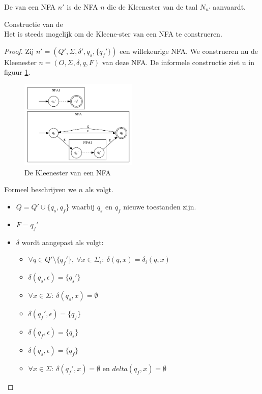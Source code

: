 \documentclass[main.tex]{subfiles}
\begin{document}
\begin{de}
  De  van een NFA $n'$ is de NFA $n$ die de Kleenester van de taal $N_{n'}$ aanvaardt.
\end{de}

\begin{st}
  Constructie van de \\
  Het is steeds mogelijk om de Kleene-ster van een NFA te construeren.

  \begin{proof}
    Zij $n' = (Q',\Sigma,\delta',q_{s},\{q_{f}'\})$ een willekeurige NFA. We construeren nu de Kleenester $n = (O,\Sigma,\delta,q,F)$ van deze NFA.
    De informele constructie ziet u in figuur \ref{fig:nfa_kleene}.
    \begin{figure}[H]
      \centering
      \includegraphics[width=0.5\textwidth]{assets/nfa_kleene.png}      
      \caption{De Kleenester van een NFA}
      \label{fig:nfa_kleene}
    \end{figure}
    Formeel beschrijven we $n$ als volgt.
    \begin{itemize}
    \item $Q = Q' \cup \{ q_{s}, q_{f} \}$ waarbij $q_{s}$ en $q_{f}$ nieuwe toestanden zijn.
    \item $F = {q_{f}'}$
    \item $\delta$ wordt aangepast als volgt:
      \begin{itemize}
      \item $\forall q \in Q'\setminus\{q_{f}'\},\ \forall x \in \Sigma_{\epsilon}:\ \delta(q,x) = \delta_{i}(q,x)$
      \item $\delta(q_{s},\epsilon) = \{q_{s}'\}$
      \item $\forall x \in \Sigma:\ \delta(q_{s},x) = \emptyset$
      \item $\delta(q_{f}',\epsilon) = \{q_{f}\}$
      \item $\delta(q_{f},\epsilon) = \{q_{s}\}$
      \item $\delta(q_{s},\epsilon) = \{q_{f}\}$
      \item $\forall x \in \Sigma:\ \delta(q_{f}',x) = \emptyset$ en $delta(q_{f},x) = \emptyset$
      \end{itemize}
    \end{itemize}
  \end{proof}
\end{st}
\end{document}
